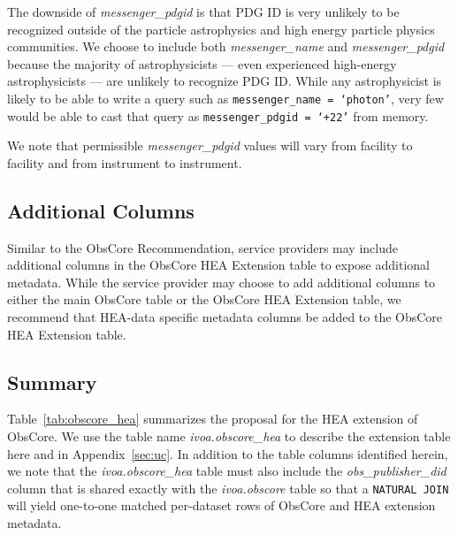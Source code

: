 \documentclass[11pt,a4paper]{ivoa}
\begin{document}
The downside of {\em messenger\_pdgid} is that PDG ID is very unlikely to be recognized outside of the particle astrophysics and high energy particle physics communities.  We choose to include both {\em messenger\_name\/} and {\em messenger\_pdgid} because the majority of astrophysicists --- even experienced high-energy astrophysicists --- are unlikely to recognize PDG ID\null.  While any astrophysicist is likely to be able to write a query such as {\tt messenger\_name = `photon'}, very few would be able to cast that query as {\tt messenger\_pdgid = `+22'} from memory.

We note that permissible {\em messenger\_pdgid\/} values will vary from facility to facility and from instrument to instrument.

\subsection{Additional Columns}

Similar to the ObsCore Recommendation, service providers may include additional columns in the ObsCore \gls{HEA} Extension table to expose additional metadata.  While the service provider may choose to add additional columns to either the main ObsCore table or the ObsCore \gls{HEA} Extension table, we recommend that \gls{HEA}-data specific metadata columns be added to the ObsCore \gls{HEA} Extension table.

\subsection{Summary}

Table~\ref{tab:obscore_hea} summarizes the proposal for the \gls{HEA} extension of ObsCore.  We use the table name {\em ivoa.obscore\_hea\/} to describe the extension table here and in Appendix~\ref{sec:uc}.  In addition to the table columns identified herein, we note that the {\em ivoa.obscore\_hea\/} table must also include the {\em obs\_publisher\_did\/} column that is shared exactly with the {\em ivoa.obscore\/} table so that a {\tt NATURAL JOIN} will yield one-to-one matched per-dataset rows of ObsCore and \gls{HEA} extension metadata.
\end{document}
